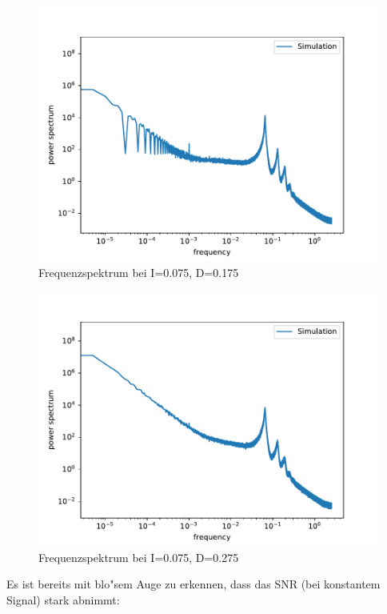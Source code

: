 \documentclass[12pt,a4paper]{article}
\begin{document}
\begin{figure}[H]
	\centering
	\includegraphics[scale=0.9]{inapik7jjem2711.pdf}
	\caption{Frequenzspektrum bei I=0.075, D=0.175}
	\label{deltaspectrum}
\end{figure}
\begin{figure}[H]
	\centering
	\includegraphics[scale=0.9]{inapik7jjem21111.pdf}
	\caption{Frequenzspektrum bei I=0.075, D=0.275}
	\label{deltaspectrum2}
\end{figure}
Es ist bereits mit blo"sem Auge zu erkennen, dass das SNR (bei konstantem Signal) stark abnimmt:
\end{document}
